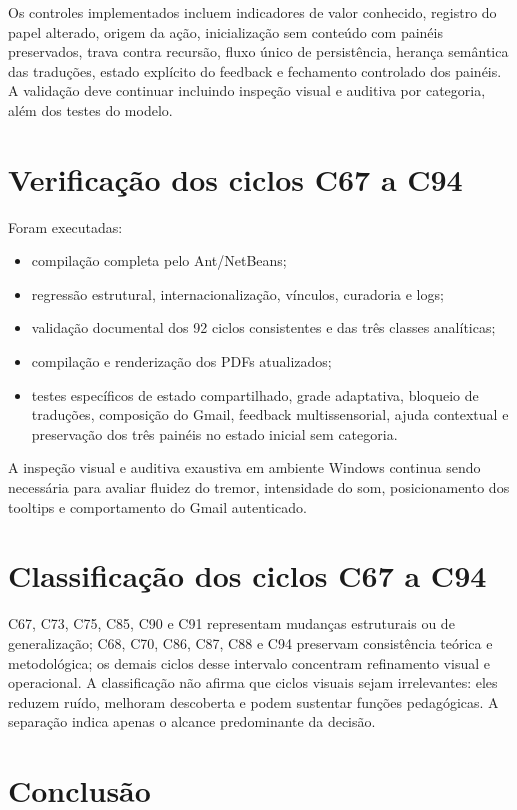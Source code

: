 \documentclass[12pt,a4paper]{article}
\begin{document}
Os controles implementados incluem indicadores de valor conhecido, registro do papel alterado, origem da ação, inicialização sem conteúdo com painéis preservados, trava contra recursão, fluxo único de persistência, herança semântica das traduções, estado explícito do feedback e fechamento controlado dos painéis. A validação deve continuar incluindo inspeção visual e auditiva por categoria, além dos testes do modelo.

\section{Verificação dos ciclos C67 a C94}

Foram executadas:
\begin{itemize}[noitemsep]
  \item compilação completa pelo Ant/NetBeans;
  \item regressão estrutural, internacionalização, vínculos, curadoria e logs;
  \item validação documental dos 92 ciclos consistentes e das três classes analíticas;
  \item compilação e renderização dos PDFs atualizados;
  \item testes específicos de estado compartilhado, grade adaptativa, bloqueio de traduções, composição do Gmail, feedback multissensorial, ajuda contextual e preservação dos três painéis no estado inicial sem categoria.
\end{itemize}

A inspeção visual e auditiva exaustiva em ambiente Windows continua sendo necessária para avaliar fluidez do tremor, intensidade do som, posicionamento dos tooltips e comportamento do Gmail autenticado.

\section{Classificação dos ciclos C67 a C94}

C67, C73, C75, C85, C90 e C91 representam mudanças estruturais ou de generalização; C68, C70, C86, C87, C88 e C94 preservam consistência teórica e metodológica; os demais ciclos desse intervalo concentram refinamento visual e operacional. A classificação não afirma que ciclos visuais sejam irrelevantes: eles reduzem ruído, melhoram descoberta e podem sustentar funções pedagógicas. A separação indica apenas o alcance predominante da decisão.

\section{Conclusão}
\end{document}
